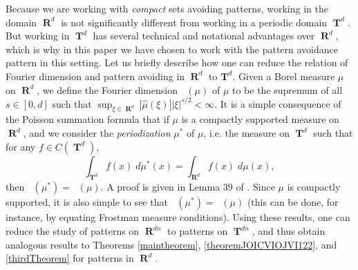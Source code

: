 \documentclass[dvipsnames,letterpaper,12pt]{article}
\numberwithin{equation}{section}
\DeclareMathOperator{\hausdim}{\dim_{\mathbf{H}}}
\DeclareMathOperator{\fordim}{\dim_{\mathbf{F}}}
\DeclareMathOperator{\RR}{\mathbf{R}}
\DeclareMathOperator{\TT}{\mathbf{T}}
\numberwithin{theorem}{section}
\begin{document}
Because we are working with \emph{compact} sets avoiding patterns, working in the domain $\RR^d$ is not significantly different from working in a periodic domain $\TT^d$. But working in $\TT^d$ has several technical and notational advantages over $\RR^d$, which is why in this paper we have chosen to work with the pattern avoidance pattern in this setting. Let us briefly describe how one can reduce the relation of Fourier dimension and pattern avoiding in $\RR^d$ to $\mathbf{T}^d$. Given a Borel measure $\mu$ on $\RR^d$, we define the Fourier dimension $\fordim(\mu)$ of $\mu$ to be the supremum of all $s \in [0,d]$ such that $\sup_{\xi \in \RR^d} |\widehat{\mu}(\xi)| |\xi|^{s/2} < \infty$. It is a simple consequence of the Poisson summation formula that if $\mu$ is a compactly supported measure on $\RR^d$, and we consider the  \emph{periodization} $\mu^*$ of $\mu$, i.e. the measure on $\TT^d$ such that for any $f \in C(\TT^d)$,
%
\begin{equation}
    \int_{\TT^d} f(x)\; d\mu^*(x) = \int_{\RR^d} f(x)\; d\mu(x),
\end{equation}
%
then $\fordim(\mu^*) = \fordim(\mu)$. A proof is given in Lemma 39 of \cite{MyThesis}. Since $\mu$ is compactly supported, it is also simple to see that $\hausdim(\mu^*) = \hausdim(\mu)$ (this can be done, for instance, by equating Frostman measure conditions). Using these results, one can reduce the study of patterns on $\RR^{dn}$ to patterns on $\TT^{dn}$, and thus obtain analogous results to Theorems \ref{maintheorem}, \ref{theoremJOICVIOJVI122}, and \ref{thirdTheorem} for patterns in $\RR^d$.

\begin{comment}
It is expected that Theorem \ref{theoremJOICVIOJVI122} is tight for general patterns $Z$. If $E$ is Salem and has dimension $d/(n-1)$, then $f(E^n)$ is a subset of $\TT^{d(n-1)}$ with nonempty interior, because
%
\begin{align*}
    \int e^{-2 \pi i \xi \cdot y} df_*(\mu^{\otimes})(y) &= \int e^{-2 \pi i \xi \cdot f(x)} d\mu(x_1) \dots d\mu(x_n)\\
    &= \lim_{k \to \infty} \int e^{-2 \pi i \xi \cdot f(x)} \phi^{\otimes}_k(x) dx\\
    &= \lim_{k \to \infty} \int e^{-2 \pi i \xi \cdot (x_1 + \dots + x_n)} \det(D_{x_1} f) \phi_k(g(z,x_2,\dots,x_n)) \phi_k^{\otimes}(x)\; dx
\end{align*}
%
where $f(g(z,x_2,\dots,x_n),x_2,\dots,x_n) = z$.
On the other hand, for patterns with richer structure this result is certainly non-optimal. For instance, in BLAH a Salem set in $\RR$ of dimension one is constructed avoiding solutions to the equation $x_3 = 2x_2 - x_1$; our techniques only guarantee the existence of a Salem set of dimension $1/2$.
\end{comment}
\end{document}
